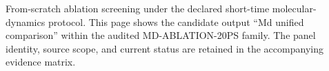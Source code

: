 From-scratch ablation screening under the declared short-time molecular-dynamics protocol. This page shows the candidate output ``Md unified comparison'' within the audited MD-ABLATION-20PS family. The panel identity, source scope, and current status are retained in the accompanying evidence matrix.
